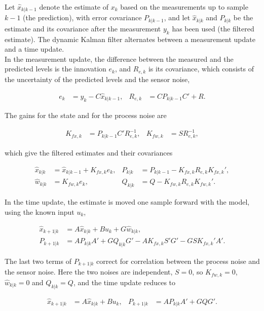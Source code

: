 Let $\hat x_{k|k-1}$ denote the estimate of $x_k$ based on the measurements up to sample $k-1$ (the prediction), with error covariance $P_{k|k-1}$, and let $\hat x_{k|k}$ and $P_{k|k}$ be the estimate and its covariance after the measurement $y_k$ has been used (the filtered estimate). The dynamic Kalman filter alternates between a measurement update and a time update.\\

In the measurement update, the difference between the measured and the predicted levels is the innovation $e_k$, and $R_{e,k}$ is its covariance, which consists of the uncertainty of the predicted levels and the sensor noise,

\begin{align}
  e_k &= y_k-C\hat x_{k|k-1}, & R_{e,k} &= CP_{k|k-1}C'+R .
\end{align}

The gains for the state and for the process noise are


\begin{align}
  K_{fx,k} &= P_{k|k-1}C'R_{e,k}^{-1}, & K_{fw,k} &= SR_{e,k}^{-1},
\end{align}

which give the filtered estimates and their covariances

\begin{align}
  \hat x_{k|k} &= \hat x_{k|k-1}+K_{fx,k}e_k, & P_{k|k} &= P_{k|k-1}-K_{fx,k}R_{e,k}K_{fx,k}', \\
  \hat w_{k|k} &= K_{fw,k}e_k, & Q_{k|k} &= Q-K_{fw,k}R_{e,k}K_{fw,k}' .
\end{align}

In the time update, the estimate is moved one sample forward with the model, using the known input $u_k$,

\begin{align}
  \hat x_{k+1|k} &= A\hat x_{k|k}+Bu_k+G\hat w_{k|k}, \\
  P_{k+1|k} &= AP_{k|k}A'+GQ_{k|k}G'-AK_{fx,k}S'G'-GSK_{fx,k}'A' .
\end{align}

The last two terms of $P_{k+1|k}$ correct for correlation between the process noise and the sensor noise. Here the two noises are independent, $S=0$, so $K_{fw,k}=0$, $\hat w_{k|k}=0$ and $Q_{k|k}=Q$, and the time update reduces to

\begin{align}
  \hat x_{k+1|k} &= A\hat x_{k|k}+Bu_k, & P_{k+1|k} &= AP_{k|k}A'+GQG' .
\end{align}

